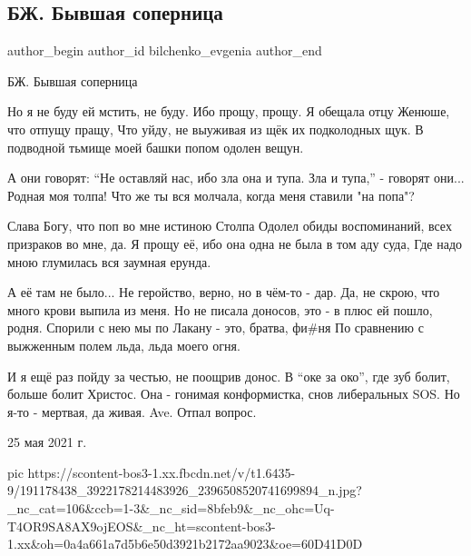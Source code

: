  
 
 
 
 
 
\subsection{БЖ. Бывшая соперница}
\label{sec:25_05_2021.fb.bilchenko_evgenia.1.byvshaja_sopernica}
\ifcmt
 author_begin
   author_id bilchenko_evgenia
 author_end
\fi

БЖ. Бывшая соперница

Но я не буду ей мстить, не буду. Ибо прощу, прощу.
Я обещала отцу Женюше, что отпущу пращу,
Что уйду, не выуживая из щёк их подколодных щук.
В подводной тьмище моей башки попом одолен вещун.

А они говорят: \enquote{Не оставляй нас, ибо зла она и тупа.
Зла и тупа,} - говорят они... Родная моя толпа!
Что же ты вся молчала, когда меня ставили "на попа"?

Слава Богу, что поп во мне истиною Столпа
Одолел обиды воспоминаний, всех призраков во мне, да.
Я прощу её, ибо она одна не была в том аду суда,
Где надо мною глумилась вся заумная ерунда.

А её там не было... Не геройство, верно, но в чём-то - дар.
Да, не скрою, что много крови выпила из меня.
Но не писала доносов, это - в плюс ей пошло, родня.
Спорили с нею мы по Лакану - это, братва, фи#ня
По сравнению с выжженным полем льда, льда моего огня.

И я ещё раз пойду за честью, не поощрив донос.
В \enquote{оке за око}, где зуб болит, больше болит Христос.
Она - гонимая конформистка, снов либеральных SOS.
Но я-то - мертвая, да живая. Ave. Отпал вопрос.

25 мая 2021 г.

\ifcmt
  pic https://scontent-bos3-1.xx.fbcdn.net/v/t1.6435-9/191178438_3922178214483926_2396508520741699894_n.jpg?_nc_cat=106&ccb=1-3&_nc_sid=8bfeb9&_nc_ohc=Uq-T4OR9SA8AX9ojEOS&_nc_ht=scontent-bos3-1.xx&oh=0a4a661a7d5b6e50d3921b2172aa9023&oe=60D41D0D
\fi

